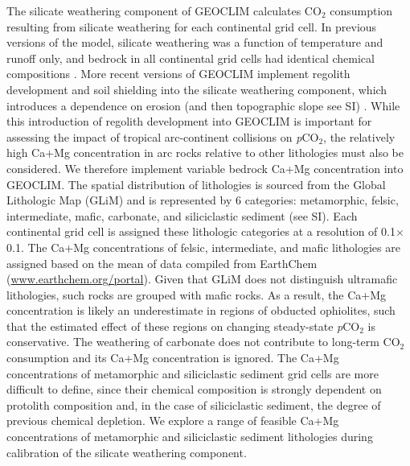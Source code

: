 \documentclass[11pt,letterpaper]{article}
\newcommand{\degrees}{\textdegree\xspace}
\newcommand{\pCOtwo}{\textit{p}CO$_{2}$\xspace}
\newcommand{\COtwo}{CO$_{2}$\xspace}
\begin{document}
The silicate weathering component of GEOCLIM calculates \COtwo consumption resulting from silicate weathering for each continental grid cell. In previous versions of the model, silicate weathering was a function of temperature and runoff only, and bedrock in all continental grid cells had identical chemical compositions \cite{Godderis2014a}. More recent versions of GEOCLIM implement regolith development and soil shielding into the silicate weathering component, which introduces a dependence on erosion (and then topographic slope see SI) \cite{Gabet2009a, West2012a}. While this introduction of regolith development into GEOCLIM is important for assessing the impact of tropical arc-continent collisions on \pCOtwo, the relatively high Ca+Mg concentration in arc rocks relative to other lithologies must also be considered. We therefore implement variable bedrock Ca+Mg concentration into GEOCLIM. The spatial distribution of lithologies is sourced from the Global Lithologic Map (GLiM) \cite{Hartmann2012a} and is represented by 6 categories: metamorphic, felsic, intermediate, mafic, carbonate, and siliciclastic sediment (see SI). Each continental grid cell is assigned these lithologic categories at a resolution of 0.1\degrees $\times$ 0.1\degrees. The Ca+Mg concentrations of felsic, intermediate, and mafic lithologies are assigned based on the mean of data compiled from EarthChem (\url{www.earthchem.org/portal}). Given that GLiM does not distinguish ultramafic lithologies, such rocks are grouped with mafic rocks. As a result, the Ca+Mg concentration is likely an underestimate in regions of obducted ophiolites, such that the estimated effect of these regions on changing steady-state \pCOtwo is conservative. The weathering of carbonate does not contribute to long-term \COtwo consumption and its Ca+Mg concentration is ignored. The Ca+Mg concentrations of metamorphic and siliciclastic sediment grid cells are more difficult to define, since their chemical composition is strongly dependent on protolith composition and, in the case of siliciclastic sediment, the degree of previous chemical depletion. We explore a range of feasible Ca+Mg concentrations of metamorphic and siliciclastic sediment lithologies during calibration of the silicate weathering component.
\end{document}
